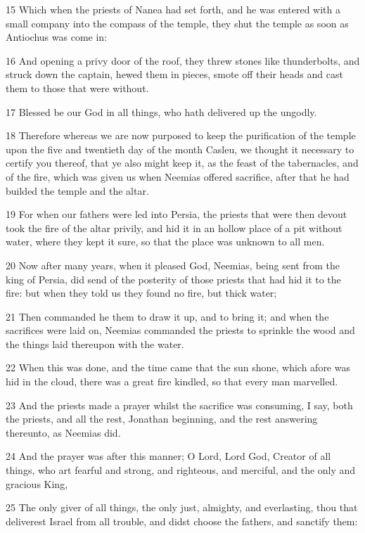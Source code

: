 \par 15 Which when the priests of Nanea had set forth, and he was entered with a small company into the compass of the temple, they shut the temple as soon as Antiochus was come in:
\par 16 And opening a privy door of the roof, they threw stones like thunderbolts, and struck down the captain, hewed them in pieces, smote off their heads and cast them to those that were without.
\par 17 Blessed be our God in all things, who hath delivered up the ungodly.
\par 18 Therefore whereas we are now purposed to keep the purification of the temple upon the five and twentieth day of the month Casleu, we thought it necessary to certify you thereof, that ye also might keep it, as the feast of the tabernacles, and of the fire, which was given us when Neemias offered sacrifice, after that he had builded the temple and the altar.
\par 19 For when our fathers were led into Persia, the priests that were then devout took the fire of the altar privily, and hid it in an hollow place of a pit without water, where they kept it sure, so that the place was unknown to all men.
\par 20 Now after many years, when it pleased God, Neemias, being sent from the king of Persia, did send of the posterity of those priests that had hid it to the fire: but when they told us they found no fire, but thick water;
\par 21 Then commanded he them to draw it up, and to bring it; and when the sacrifices were laid on, Neemias commanded the priests to sprinkle the wood and the things laid thereupon with the water.
\par 22 When this was done, and the time came that the sun shone, which afore was hid in the cloud, there was a great fire kindled, so that every man marvelled.
\par 23 And the priests made a prayer whilst the sacrifice was consuming, I say, both the priests, and all the rest, Jonathan beginning, and the rest answering thereunto, as Neemias did.
\par 24 And the prayer was after this manner; O Lord, Lord God, Creator of all things, who art fearful and strong, and righteous, and merciful, and the only and gracious King,
\par 25 The only giver of all things, the only just, almighty, and everlasting, thou that deliverest Israel from all trouble, and didst choose the fathers, and sanctify them:

